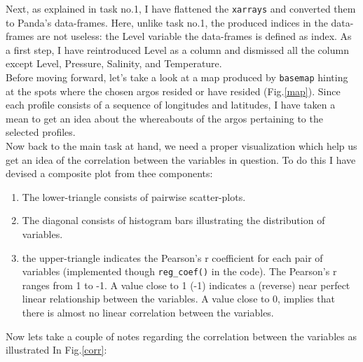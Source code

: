 \documentclass[12pt]{article}
\begin{document}
Next, as explained in task no.1, I have flattened the \verb|xarrays| 
and converted them to Panda's data-frames. Here, unlike
task no.1, the produced indices in the data-frames are not useless: 
the Level variable the data-frames is defined as 
index. As a first step, I have reintroduced Level as a column and 
dismissed all the column except Level, Pressure, 
Salinity, and Temperature.\\

Before moving forward, let's take a look at a map produced by 
\verb|basemap| hinting at the spots where
the chosen argos resided or have resided (Fig.\ref{map}). 
Since each profile consists of a sequence of longitudes and 
latitudes,
I have taken a mean to get an idea about the whereabouts of 
the argos pertaining to the selected profiles.\\

Now back to the main task at hand, we need a proper 
visualization which help us get an idea of the correlation
between the variables in question. To do this I have 
devised a composite plot from thee components: 

    \begin{enumerate}
        \item The lower-triangle consists of pairwise scatter-plots.
        \item The diagonal consists of histogram bars illustrating 
        the distribution of variables.
        \item the upper-triangle indicates the Pearson's r 
        coefficient for each pair of variables 
        (implemented though \verb|reg_coef()| 
        in the code). The Pearson's r ranges from 1 to -1.
        A value close to 1 (-1) indicates a (reverse) near
        perfect linear relationship between the variables.
        A value close to 0, implies that there is almost no 
        linear correlation between the variables.
    \end{enumerate}



    Now lets take a couple of notes regarding the
    correlation between the variables as illustrated In
    Fig.\ref{corr}:
    
\end{document}
